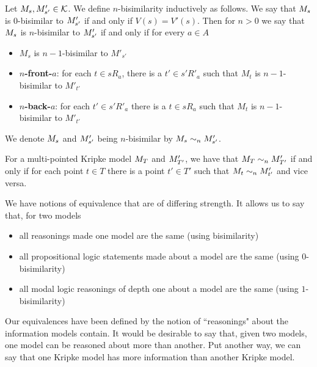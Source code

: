 \begin{defn} \label{nBisimKripke}
Let $M_s, M'_{s'} \in \mathcal{K}$.
We define $n$-bisimilarity inductively as follows.
We say that $M_s$ is $0$-bisimilar to $M'_{s'}$ if and only if $V(s) = V'(s)$.
Then for $n > 0$ we say that $M_s$ is $n$-bisimilar to $M'_{s'}$ if and only if for every $a \in A$
\begin{itemize}
	\item $M_s$ is $n-1$-bisimilar to $M'_{s'}$
	\item {\bf $n$-front-$a$}: for each $t \in s R_a$, there is a $t' \in s' R'_a$ such that $M_t$ is
	$n-1$-bisimilar to $M'_{t'}$
	\item {\bf $n$-back-$a$}: for each $t' \in s' R'_a$ there is a $t \in s R_a$ such that $M_t$ is
	$n-1$-bisimilar to $M'_{t'}$
\end{itemize}
We denote $M_s$ and $M'_{s'}$ being $n$-bisimilar by $M_s \sim_n
M'_{s'}$.
\end{defn}
For a multi-pointed Kripke model $M_T$ and $M'_{T'}$, we have that
$M_T \sim_n
M'_{T'}$ if and only if for each point $t \in T$ there is a point $t' \in T'$
such that $M_t \sim_n M'_{t'}$ and vice versa.

We have notions of equivalence that are of differing strength.
It allows us to say that, for two models
\begin{itemize}
	\item all reasonings made one model are the same (using bisimilarity)
	\item all propositional logic statements made about a model are the same (using $0$-bisimilarity)
	\item all modal logic reasonings of depth one about a model are the same (using $1$-bisimilarity)
\end{itemize}

Our equivalences have been defined by the notion of ``reasonings" about the information models
contain.
It would be desirable to say that, given two models, one model can be reasoned about more than
another.
Put another way, we can say that one Kripke model has more information than another Kripke model.

